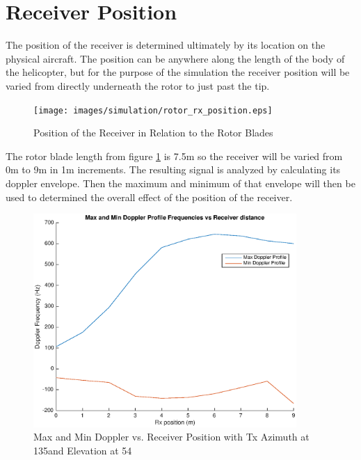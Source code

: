 \section{Receiver Position}
The position of the receiver is determined ultimately by its location on the physical aircraft. The position can be anywhere along the length of the body of the helicopter, but for the purpose of the simulation the receiver position will be varied from directly underneath the rotor to just past the tip. 

\begin{figure}
	\begin{center}
		\texttt{[image: images/simulation/rotor\_rx\_position.eps]}
		\caption{Position of the Receiver in Relation to the Rotor Blades}
		\label{fig:rx_position_image}
	\end{center}
\end{figure}

The rotor blade length from figure \ref{fig:rx_position_image} is 7.5m so the receiver will be varied from 0m to 9m in 1m increments. The resulting signal is analyzed by calculating its doppler envelope. Then the maximum and minimum of that envelope will then be used to determined the overall effect of the position of the receiver.

\begin{figure}
	\begin{center}
		\includegraphics[width=10cm]{images/simulation/receiver_position_max_doppler.eps}
		\caption{Max and Min Doppler vs. Receiver Position with Tx Azimuth at 135\textdegree \space and Elevation at 54\textdegree}
		\label{fig:rx_position}
	\end{center}
\end{figure}

